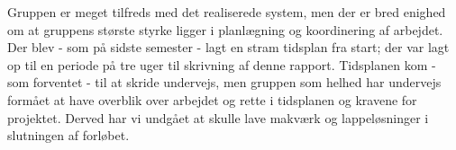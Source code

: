 Gruppen er meget tilfreds med det realiserede system, men der er bred enighed om at gruppens største styrke ligger i planlægning og koordinering af arbejdet. 
Der blev - som på sidste semester - lagt en stram tidsplan fra start; der var lagt op til en periode på tre uger til skrivning af denne rapport. 
Tidsplanen kom - som forventet - til at skride undervejs, men gruppen som helhed har undervejs formået at have overblik over arbejdet og rette i tidsplanen og kravene for projektet. 
Derved har vi undgået at skulle lave makværk og lappeløsninger i slutningen af forløbet. 

\clearpage